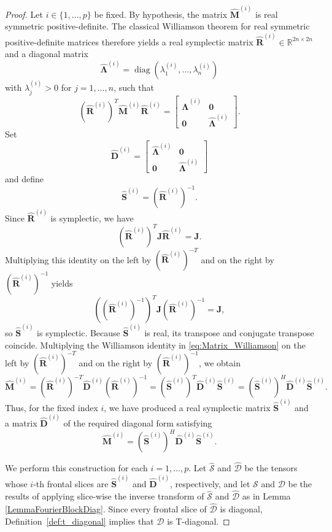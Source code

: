 \documentclass[pdflatex,sn-mathphys-ay]{sn-jnl}
\newcommand{\T}[1]{\mathcal{#1}}    %
\newcommand{\M}[1]{\bm{#1}}     %
\newcommand{\R}{\mathbb{R}}         %
\newcommand{\diag}{\operatorname{diag}}
\theoremstyle{thmstyleone}
\theoremstyle{thmstyletwo}
\theoremstyle{thmstylethree}
\numberwithin{equation}{section}
\begin{document}
\begin{proof}
Let $i \in \{1,\dots,p\}$ be fixed. 
By hypothesis, the matrix $\widehat{\M{M}}^{(i)}$ is real symmetric positive-definite. 
The classical Williamson theorem for real symmetric positive-definite matrices therefore yields a real symplectic matrix $\widehat{\M{R}}^{(i)} \in \R^{2n\times 2n}$ and a diagonal matrix
$$
\widehat{\M{\Lambda}}^{(i)} = \diag(\lambda_1^{(i)},\dots,\lambda_n^{(i)})
$$
with $\lambda_j^{(i)} > 0$ for $j=1,\dots,n$, such that
\begin{equation}\label{eq:Matrix_Williamson}
(\widehat{\M{R}}^{(i)})^T \widehat{\M{M}}^{(i)} \widehat{\M{R}}^{(i)}
=
\begin{bmatrix}
\widehat{\M{\Lambda}}^{(i)} & \M{0} \\
\M{0} & \widehat{\M{\Lambda}}^{(i)}
\end{bmatrix}.
\end{equation}
Set
$$
\widehat{\M{D}}^{(i)}
=
\begin{bmatrix}
\widehat{\M{\Lambda}}^{(i)} & \M{0} \\
\M{0} & \widehat{\M{\Lambda}}^{(i)}
\end{bmatrix}
$$
and define
$$
\widehat{\M{S}}^{(i)} = (\widehat{\M{R}}^{(i)})^{-1}.
$$
Since $\widehat{\M{R}}^{(i)}$ is symplectic, we have
$$
(\widehat{\M{R}}^{(i)})^T \M{J}\widehat{\M{R}}^{(i)} = \M{J}.
$$
Multiplying this identity on the left by $(\widehat{\M{R}}^{(i)})^{-T}$ and on the right by $(\widehat{\M{R}}^{(i)})^{-1}$ yields
$$
((\widehat{\M{R}}^{(i)})^{-1})^T \M{J}(\widehat{\M{R}}^{(i)})^{-1} = \M{J},
$$
so $\widehat{\M{S}}^{(i)}$ is symplectic. Because $\widehat{\M{S}}^{(i)}$ is real, its transpose and conjugate transpose coincide. Multiplying the Williamson identity in \eqref{eq:Matrix_Williamson} on the left by $(\widehat{\M{R}}^{(i)})^{-T}$ and on the right by $(\widehat{\M{R}}^{(i)})^{-1}$, we obtain
$$
\widehat{\M{M}}^{(i)}
=
(\widehat{\M{R}}^{(i)})^{-T}\widehat{\M{D}}^{(i)}(\widehat{\M{R}}^{(i)})^{-1}
=
(\widehat{\M{S}}^{(i)})^T\widehat{\M{D}}^{(i)}\widehat{\M{S}}^{(i)}
=
(\widehat{\M{S}}^{(i)})^H\widehat{\M{D}}^{(i)}\widehat{\M{S}}^{(i)}.
$$
Thus, for the fixed index $i$, we have produced a real symplectic matrix $\widehat{\M{S}}^{(i)}$ and a matrix $\widehat{\M{D}}^{(i)}$ of the required diagonal form satisfying
$$
\widehat{\M{M}}^{(i)} = (\widehat{\M{S}}^{(i)})^H\widehat{\M{D}}^{(i)}\widehat{\M{S}}^{(i)}.
$$

We perform this construction for each $i=1,\dots,p$. Let $\widehat{\T{S}}$ and $\widehat{\T{D}}$ be the tensors whose $i$-th frontal slices are $\widehat{\M{S}}^{(i)}$ and $\widehat{\M{D}}^{(i)}$, respectively, and let $\T{S}$ and $\T{D}$ be the results of applying slice-wise the inverse transform of $\widehat{\T{S}}$ and $\widehat{\T{D}}$ as in Lemma \ref{LemmaFourierBlockDiag}. Since every frontal slice of $\widehat{\T{D}}$ is diagonal, Definition~\ref{def:t_diagonal} implies that $\T{D}$ is T-diagonal.


\end{proof}
\end{document}
